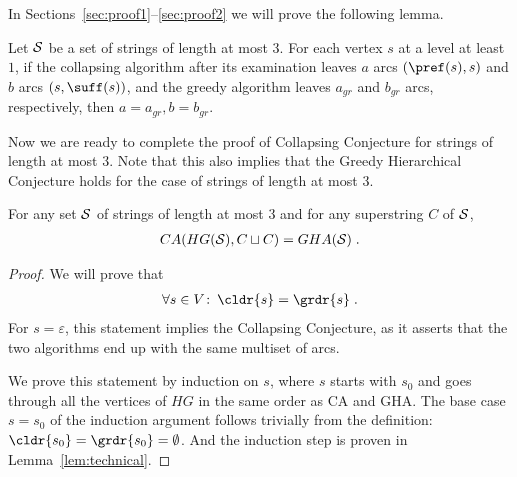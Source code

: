 In Sections~\ref{sec:proof1}--\ref{sec:proof2} we will prove the following lemma.
\begin{lemma}
\label{lem:technical}
Let ${\cal S}$ be a set of strings of length at most $3$. For each vertex $ s $ at a level at least $1$, if the collapsing algorithm after its examination leaves $ a $ arcs $ (\pref (s), s) $ and $ b$ arcs $ (s, \suff(s) ) $, and the greedy algorithm leaves $ a_{gr} $ and $ b_{gr} $ arcs, respectively, then $ a = a_{gr}, b = b_{gr} $.
\end{lemma}

Now we are ready to complete the proof of Collapsing Conjecture for strings of length at most $3$. Note that this also implies that the Greedy Hierarchical Conjecture holds for the case of strings of length at most $3$.

\begin{theorem}
\label{thm:main}
For any set ${\cal S}$ of strings of length at most $3$ and for any superstring $C$ of ${\cal S}$, 
\begin{align*}
CA(HG({\cal S}), C \sqcup C) = GHA({\cal S}) \; .
\end{align*}
\end{theorem}

\begin{proof}
We will prove that
\begin{align*}
\forall s \in V\colon\, \cldr{s}=\grdr{s} \; .
\end{align*}
For $s=\varepsilon$, this statement implies the Collapsing Conjecture, as it asserts that the two algorithms end up with the same multiset of arcs. 

We prove this statement by induction on $s$, where $s$ starts with $s_0$ and goes through all the vertices of $HG$ in the same order as CA and GHA. The base case $s=s_0$ of the induction argument follows trivially from the definition: $\cldr{s_0}=\grdr{s_0}=\emptyset$. And the induction step is proven in Lemma~\ref{lem:technical}.
\end{proof}



